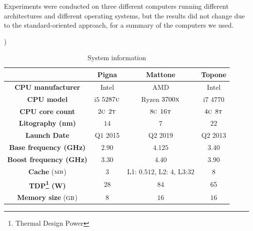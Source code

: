 Experiments were conducted on three different computers running different architectures and
different operating systems, but the results did not change due to the standard-oriented approach,
 for a summary of the computers we used.
\begin{center})
	\begin{longtable}{|c|c|c|c|}
		\caption{System information}\label{tbl:computers}
		\\\textbf{}                             & \textbf{Pigna}
		                                                & \textbf{Mattone}
		                                                & \textbf{Topone}
		\\\hline\hline
		\endfirsthead\hline\endlastfoot

		\textbf{CPU manufacturer}                       & Intel
		                                                & AMD
		                                                & Intel
		\\\hline
		\textbf{CPU model}                              & i$5$ $5287\textsc{u}$
		                                                & Ryzen $3700\textsc{x}$
		                                                & i$7$ $4770$
		\\\hline
		\textbf{CPU core count}                         & $2\textsc{c}$ $2\textsc{t}$
		                                                & $8\textsc{c}$ $16\textsc{t}$
		                                                & $4\textsc{c}$ $8\textsc{t}$
		\\\hline
		\textbf{Litography (nm)}                        & $14$
		                                                & $7$
		                                                & $22$
		\\\hline
		\textbf{Launch Date}                            & Q$1$ 2015
		                                                & Q$2$ 2019
		                                                & Q$2$ 2013
		\\\hline
		\textbf{Base frequency (GHz)}                   & $2.90$
		                                                & $4.125$
		                                                & $3.40$
		\\\hline
		\textbf{Boost frequency (GHz)}                  & $3.30$
		                                                & $4.40$
		                                                & $3.90$
		\\\hline
		\textbf{Cache} ($\textsc{mb}$)                  & $3$
		                                                & L1: $0.512$, L2: $4$, L3:$32$
		                                                & $8$
		\\\hline
		\textbf{TDP\footnote{Thermal Design Power} (W)} & 28
		                                                & 84
		                                                & 65
		\\\hline
		\textbf{Memory size} ($\textsc{gb}$)            & $8$
		                                                & $16$
		                                                & $16$
	\end{longtable}
\end{center}








